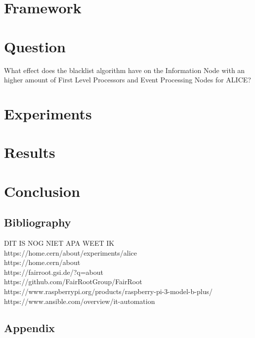 \documentclass{report}
\begin{document}


\newpage

\chapter{Framework}



\chapter{Question}
What effect does the blacklist algorithm have on the Information Node with an higher amount of First Level Processors and Event Processing Nodes for ALICE?

\chapter{Experiments}



\chapter{Results}



\chapter{Conclusion}

\section*{Bibliography}
DIT IS NOG NIET APA WEET IK\\
https://home.cern/about/experiments/alice\\
https://home.cern/about\\
https://fairroot.gsi.de/?q=about\\
https://github.com/FairRootGroup/FairRoot\\
https://www.raspberrypi.org/products/raspberry-pi-3-model-b-plus/\\
https://www.ansible.com/overview/it-automation\\


\section{Appendix}


\end{document}
